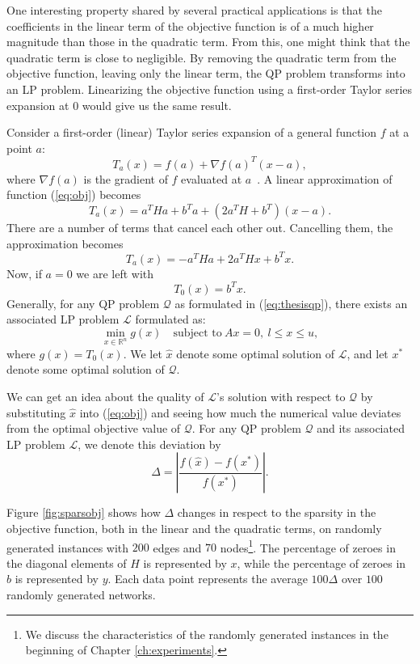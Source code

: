 One interesting property shared by several practical applications is that the
coefficients in the linear term of the objective function is of a much higher
magnitude than those in the quadratic term.
From this, one might think that the quadratic term is close to negligible.
By removing the quadratic term from the objective function, leaving only the
linear term, the QP problem transforms into an LP problem.
Linearizing the objective function using a first-order Taylor series expansion
at 0 would give us the same result.

Consider a first-order (linear) Taylor series expansion of a
general function $f$ at a point $a$:
\[
T_a(x) = f(a) + \nabla f(a)^T(x-a),
\]
where $\nabla f(a)$ is the gradient of $f$ evaluated at $a$~\cite{apostol}.
A linear approximation of function (\ref{eq:obj}) becomes
\[
T_a(x) = a^THa + b^Ta + (2a^TH + b^T)(x - a).
\]
There are a number of terms that cancel each other out. Cancelling them,
the approximation becomes
\begin{equation}
\label{eq:texp}
T_a(x) = - a^THa + 2a^THx + b^Tx.
\end{equation}
Now, if $a = 0$ we are left with
\[
T_0(x) = b^Tx.
\]
Generally, for any QP problem $\mathcal{Q}$ as formulated in
(\ref{eq:thesisqp}), there exists an associated LP problem $\mathcal{L}$
formulated as:
\[
\min_{x \in \mathbb{R}^n} g(x)
\quad \textrm{subject to}
~
Ax = 0,
~
l \le x \le u,
\]
where $g(x) = T_0(x)$.
We let $\hat{x}$ denote some optimal solution of $\mathcal{L}$, and let $x^*$
denote some optimal solution of $\mathcal{Q}$.

We can get an idea about the quality of
$\mathcal{L}$'s solution with respect to $\mathcal{Q}$ by substituting
$\hat{x}$ into (\ref{eq:obj}) and seeing how much the numerical value
deviates from the optimal objective value of $\mathcal{Q}$.
For any QP problem $\mathcal{Q}$ and its associated LP problem $\mathcal{L}$,
we denote this deviation by
\[
\Delta = \left|\frac{f(\hat{x}) - f(x^*)}{f(x^*)}\right|.
\]

Figure \ref{fig:sparsobj} shows how $\Delta$ changes in respect to the sparsity
in the objective function, both in the linear and the quadratic terms, on
randomly generated instances with $200$ edges and $70$ nodes\footnote{
We discuss the
characteristics of the randomly generated instances in the beginning of Chapter
\ref{ch:experiments}.}.
The percentage of zeroes in the diagonal elements of $H$ is represented
by $x$, while the percentage of zeroes in $b$ is represented by $y$.
Each data point represents the average $100\Delta$ over
$100$ randomly generated networks. 

